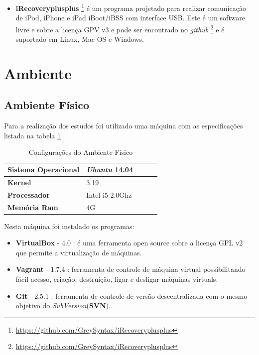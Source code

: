 \begin{itemize}
    \item \textbf{iRecoveryplusplus}
\footnote{\url{https://github.com/GreySyntax/iRecoveryplusplus}} é um programa projetado para
 realizar comunicação de iPod, iPhone e iPad iBoot/iBSS  com interface USB. 
Este é um software livre e sobre a licença GPV v3 e pode ser encontrado no \textit{github}
\footnote{\url{https://github.com/GreySyntax/iRecoveryplusplus}} e é suportado em Linux, Mac OS e Windows.

\end{itemize}




\section{Ambiente}

\subsection{Ambiente Físico}
Para a realização dos estudos foi utilizado uma máquina com as
 especificações listada na tabela \ref{configuracoes_ambiente_fisico}

\begin{table}[h]
\centering
\begin{tabular}{lllll}
\textbf{Sistema Operacional} & \textit{Ubuntu} 14.04 \\ \toprule
\textbf{Kernel} & 3.19  \\ \midrule 
\textbf{Processador} & Intel i5 2.0Ghz \\ \midrule
\textbf{Memória Ram} & 4G  \\ \bottomrule 
\end{tabular} 
\caption{Configurações do Ambiente Físico}
\label{configuracoes_ambiente_fisico}
\end{table}


Nesta máquina foi instalado os programas:

\begin{itemize}
    \item \textbf{VirtualBox} - 4.0 : é uma ferramenta open source sobre a
 licença GPL v2 que permite a virtualização de máquinas.
    \item \textbf{Vagrant} - 1.7.4 : ferramenta de controle de
 máquina virtual possibilitando fácil acesso, criação, destruição, ligar e 
desligar máquinas virtuals.
    \item \textbf{Git} - 2.5.1 : ferramenta de controle de versão descentralizada
com o mesmo objetivo do \textit{SubVersion}(\textbf{SVN}).
\end{itemize}

